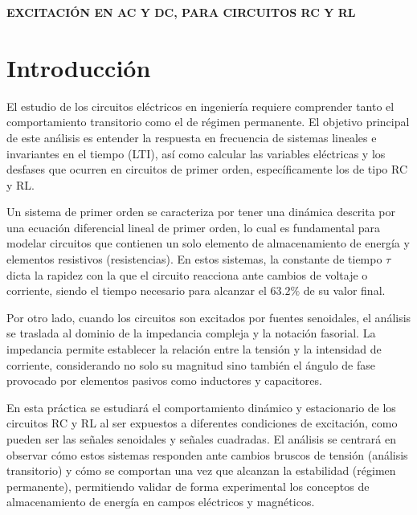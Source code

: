\documentclass[letter,11pt]{article}
\begin{document}
	\newpage
	\vspace*{0.5cm} 
	\hfill {\Large \bf {\LARGE EXCITACIÓN EN AC Y DC, PARA CIRCUITOS RC Y RL}} 
	\renewcommand{\contentsname}{Contenido}
	\setlength{\cftbeforetoctitleskip}{0pt}
	\tableofcontents
	\thispagestyle{fancy}
	\newpage
	
\section{Introducción}
	
	El estudio de los circuitos eléctricos en ingeniería requiere comprender tanto el comportamiento transitorio como el de régimen permanente. 
	El objetivo principal de este análisis es entender la respuesta en frecuencia de sistemas lineales e invariantes en el tiempo (LTI),
	así como calcular las variables eléctricas y los desfases que ocurren en circuitos de primer orden, 
	específicamente los de tipo RC y RL.
	
	\hspace{0.5cm}Un sistema de primer orden se caracteriza por tener una dinámica descrita por una ecuación diferencial lineal de primer orden, lo cual es fundamental para modelar circuitos que contienen un solo elemento de almacenamiento de energía y elementos resistivos (resistencias).
	En estos sistemas, la constante de tiempo $\tau$ dicta la rapidez con la que el circuito reacciona ante cambios de voltaje o corriente, siendo el tiempo necesario para alcanzar el $63.2\%$ de su valor final.
	
	\hspace{0.5cm}Por otro lado, cuando los circuitos son excitados por fuentes senoidales, el análisis se traslada al dominio de la impedancia compleja y la notación fasorial. La impedancia permite establecer la relación entre la tensión y la intensidad de corriente, considerando no solo su magnitud sino también el ángulo de fase provocado por elementos pasivos como inductores y capacitores.
	
	\hspace{0.5cm}En esta práctica se estudiará el comportamiento dinámico y estacionario de los circuitos RC y RL al ser expuestos a diferentes condiciones de excitación, como pueden ser las señales senoidales y señales cuadradas.
	El análisis se centrará en observar cómo estos sistemas responden ante cambios bruscos de tensión (análisis transitorio) y cómo se comportan una vez que alcanzan la estabilidad (régimen permanente), permitiendo validar de forma experimental los conceptos de almacenamiento de energía en campos eléctricos y magnéticos.
	
\end{document}
